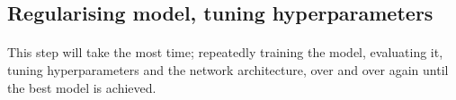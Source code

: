 \documentclass[12pt, a4paper]{article}
\begin{document}
\subsection{Regularising model, tuning hyperparameters}
\paragraph*{}
This step will take the most time; repeatedly training the model, evaluating it,
tuning hyperparameters and the network architecture, over and over again until 
the best model is achieved.
\end{document}
